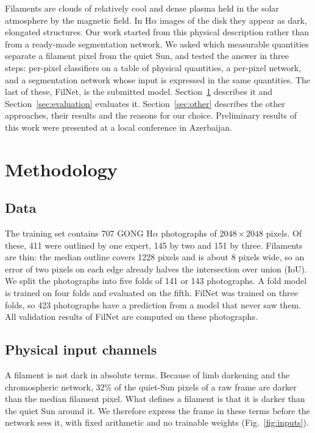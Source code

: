 \documentclass[sigconf]{acmart}
\newcommand{\nfolds}{three}          %
\newcommand{\noof}{423}              %
\begin{document}
    Filaments are clouds of relatively cool and dense plasma held in the solar atmosphere by the magnetic field. In H$\alpha$ images of the disk they appear as dark, elongated structures. Our work started from this physical description rather than from a ready-made segmentation network. We asked which measurable quantities separate a filament pixel from the quiet Sun, and tested the answer in three steps: per-pixel classifiers on a table of physical quantities, a per-pixel network, and a segmentation network whose input is expressed in the same quantities. The last of these, FilNet, is the submitted model. Section~\ref{sec:methodology} describes it and Section~\ref{sec:evaluation} evaluates it. Section~\ref{sec:other} describes the other approaches, their results and the reasons for our choice. Preliminary results of this work were presented at a local conference in Azerbaijan.


\section{Methodology}\label{sec:methodology}

\subsection{Data}
The training set contains 707 GONG H$\alpha$ photographs of $2048\times2048$ pixels. Of these, 411 were outlined by one expert, 145 by two and 151 by three. Filaments are thin: the median outline covers 1228 pixels and is about 8 pixels wide, so an error of two pixels on each edge already halves the intersection over union (IoU). We split the photographs into five folds of 141 or 143 photographs. A fold model is trained on four folds and evaluated on the fifth. FilNet was trained on \nfolds{} folds, so \noof{} photographs have a prediction from a model that never saw them. All validation results of FilNet are computed on these photographs.

\subsection{Physical input channels}
A filament is not dark in absolute terms. Because of limb darkening and the chromospheric network, 32\% of the quiet-Sun pixels of a raw frame are darker than the median filament pixel. What defines a filament is that it is darker than the quiet Sun around it. We therefore express the frame in these terms before the network sees it, with fixed arithmetic and no trainable weights (Fig.~\ref{fig:inputs}).
\end{document}
